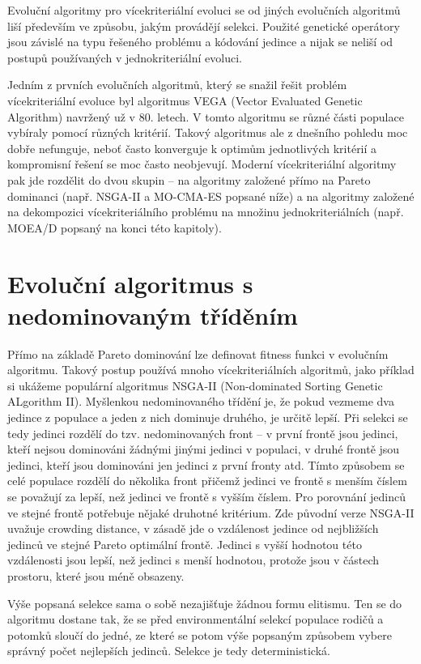 \bigskip

Evoluční algoritmy pro vícekriteriální evoluci se od jiných evolučních algoritmů liší především ve způsobu, jakým provádějí selekci. Použité genetické operátory jsou závislé na typu řešeného problému a kódování jedince a nijak se neliší od postupů používaných v jednokriteriální evoluci. 

Jedním z prvních evolučních algoritmů, který se snažil řešit problém vícekriteriální evoluce byl algoritmus VEGA (Vector Evaluated Genetic Algorithm) navržený už v 80. letech. V tomto algoritmu se různé části populace vybíraly pomocí různých kritérií. Takový algoritmus ale z dnešního pohledu moc dobře nefunguje, neboť často konverguje k optimům jednotlivých kritérií a kompromisní řešení se moc často neobjevují. Moderní vícekriteriální algoritmy pak jde rozdělit do dvou skupin -- na algoritmy založené přímo na Pareto dominanci (např. NSGA-II a MO-CMA-ES popsané níže) a na algoritmy založené na dekompozici vícekriteriálního problému na množinu jednokriteriálních (např. MOEA/D popsaný na konci této kapitoly).


\section{Evoluční algoritmus s nedominovaným tříděním}

Přímo na základě Pareto dominování lze definovat fitness funkci v evolučním algoritmu. Takový postup používá mnoho vícekriteriálních algoritmů, jako příklad si ukážeme populární algoritmus NSGA-II (Non-dominated Sorting Genetic ALgorithm II). Myšlenkou nedominovaného třídění je, že pokud vezmeme dva jedince z populace a jeden z nich dominuje druhého, je určitě lepší. Při selekci se tedy jedinci rozdělí do tzv. nedominovaných front -- v první frontě jsou jedinci, kteří nejsou dominováni žádnými jinými jedinci v populaci, v druhé frontě jsou jedinci, kteří jsou dominováni jen jedinci z první fronty atd.
Tímto způsobem se celé populace rozdělí do několika front přičemž jedinci ve frontě s menším číslem se považují za lepší, než jedinci ve frontě s vyšším číslem. Pro porovnání jedinců ve stejné frontě potřebuje nějaké druhotné kritérium. Zde původní verze NSGA-II uvažuje crowding distance, v zásadě jde o vzdálenost jedince od nejbližších jedinců ve stejné Pareto optimální frontě. Jedinci s vyšší hodnotou této vzdálenosti jsou lepší, než jedinci s menší hodnotou, protože jsou v částech prostoru, které jsou méně obsazeny. 

Výše popsaná selekce sama o sobě nezajišťuje žádnou formu elitismu. Ten se do algoritmu dostane tak, že se před environmentální selekcí populace rodičů a potomků sloučí do jedné, ze které se potom výše popsaným způsobem vybere správný počet nejlepších jedinců. Selekce je tedy deterministická.

